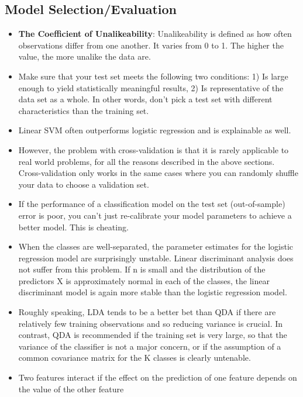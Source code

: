 \documentclass[]{book}
\begin{document}
\hypertarget{model-selectionevaluation}{%
\subsection{Model Selection/Evaluation}\label{model-selectionevaluation}}

\begin{itemize}
\item
  \textbf{The Coefficient of Unalikeability}: Unalikeability is defined as how often observations differ from one another. It varies from 0 to 1. The higher the value, the more unalike the data are.
\item
  Make sure that your test set meets the following two conditions: 1) Is large enough to yield statistically meaningful results, 2) Is representative of the data set as a whole. In other words, don't pick a test set with different characteristics than the training set.
\item
  Linear SVM often outperforms logistic regression and is explainable as well.
\item
  However, the problem with cross-validation is that it is rarely applicable to real world problems, for all the reasons described in the above sections. Cross-validation only works in the same cases where you can randomly shuffle your data to choose a validation set.
\item
  If the performance of a classification model on the test set (out-of-sample) error is poor, you can't just re-calibrate your model parameters to achieve a better model. This is cheating.
\item
  When the classes are well-separated, the parameter estimates for the logistic regression model are surprisingly unstable. Linear discriminant analysis does not suffer from this problem. If n is small and the distribution of the predictors X is approximately normal in each of the classes, the linear discriminant model is again more stable than the logistic regression model.
\item
  Roughly speaking, LDA tends to be a better bet than QDA if there are relatively few training observations and so reducing variance is crucial. In contrast, QDA is recommended if the training set is very large, so that the variance of the classifier is not a major concern, or if the assumption of a common covariance matrix for the K classes is clearly untenable.
\item
  Two features interact if the effect on the prediction of one feature depends on the value of the other feature

\end{itemize}
\end{document}
